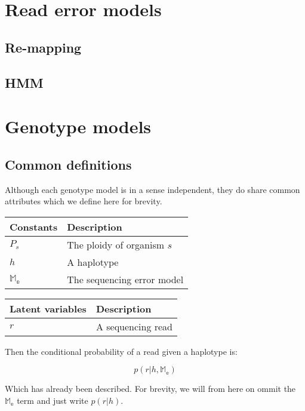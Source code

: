 \documentclass{article}
\begin{document}
\section{Read error models}

\subsection{Re-mapping}

\subsection{HMM}

\section{Genotype models}

\subsection{Common definitions}

Although each genotype model is in a sense independent, they do share common attributes which we define here for brevity.

\begin{center}
\begin{tabular}{ll}
Constants & Description \\
\hline
$P_s$ & The ploidy of organism $s$\\
$h$ & A haplotype \\
$\mathbb{M_{e}}$ & The sequencing error model \\
\hline
\end{tabular}
\end{center}

\begin{center}
\begin{tabular}{ll}
Latent variables & Description \\
\hline
$r$ & A sequencing read \\
\hline
\end{tabular}
\end{center}

Then the conditional probability of a read given a haplotype is:

\begin{equation}
\label{eq:read_prob}
    p(r | h, \mathbb{M_{e}})
\end{equation}

Which has already been described. For brevity, we will from here on ommit the $\mathbb{M_{e}}$ term and just write $p(r | h)$.
\end{document}
